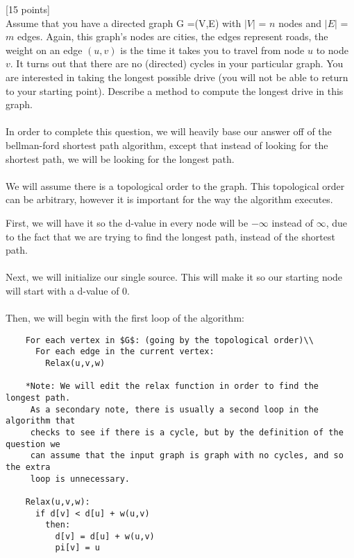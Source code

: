 \documentclass[12pt]{article}
\newcounter{ques}
\newenvironment{question}{\stepcounter{ques}{\noindent\bf Question \arabic{ques}:}}{\vspace{5mm}}
\begin{document}
\begin{question}[15 points]\\
  Assume that you have a directed graph G =(V,E) with $|V|$  = $n$ nodes and $|E|$ = $m$ edges. Again, this graph's nodes are cities, the edges  represent roads,  the weight on an edge $(u,v)$ is the time it takes you to travel from node $u$ to node $v$.  It turns out that there are no (directed) cycles in your particular graph.
  You are interested in taking the longest possible drive (you will not be able to return to your starting point).
  Describe a method to compute the longest drive in this graph.\\\\

  In order to complete this question, we will heavily base our answer off of the bellman-ford shortest path algorithm, except that instead of looking for the shortest path, we will be looking for the longest path.\\\\

  We will assume there is a topological order to the graph. This topological order can be arbitrary, however it is important for the way the algorithm executes.

  First, we will have it so the d-value in every node will be $-\infty$ instead of $\infty$, due to the fact that we are trying to find the longest path, instead of the shortest path.\\\\

  Next, we will initialize our single source. This will make it so our starting node will start with a d-value of 0.\\\\

  Then, we will begin with the first loop of the algorithm:\\
  \begin{verbatim}
    For each vertex in $G$: (going by the topological order)\\
      For each edge in the current vertex:
        Relax(u,v,w)

    *Note: We will edit the relax function in order to find the longest path.
     As a secondary note, there is usually a second loop in the algorithm that
     checks to see if there is a cycle, but by the definition of the question we
     can assume that the input graph is graph with no cycles, and so the extra
     loop is unnecessary.

    Relax(u,v,w):
      if d[v] < d[u] + w(u,v)
        then:
          d[v] = d[u] + w(u,v)
          pi[v] = u


\end{verbatim}
\end{question}
\end{document}
